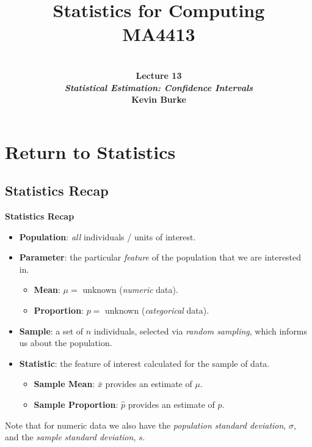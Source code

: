 \documentclass[compress]{beamer}        %
\title{{\huge Statistics for Computing\\[0.1cm]MA4413}}
\author[Kevin Burke]{{\bf\\[0.5cm]{\huge Lecture 13}\\[0.2cm]\emph{Statistical Estimation: Confidence Intervals}\\[1.4cm]Kevin Burke}\\[0.3cm]\tcb{kevin.burke@ul.ie}}
\institute[University of Limerick, Maths \& Stats Dept]{}
\date{}
\makeatletter
\newcommand{\tcb}{\textcolor{beamer@blendedblue}}
\makeatother
\begin{document}
\begin{frame}[t]
\titlepage
\end{frame}



\section{Return to Statistics}
\subsection{Statistics Recap}
\begin{frame}{\bf \tcb{Statistics Recap\\[-0.9cm]}}

\begin{itemize}\itemsep0.5cm
\item {\bf Population}: \emph{all} individuals / units of interest.
\item {\bf Parameter}: the particular \emph{feature} of the population that we are interested in.
\begin{itemize}\itemsep0.2cm
\item {\bf Mean}: $\mu =$ unknown (\emph{numeric} data).
\item {\bf Proportion}: $p =$ unknown (\emph{categorical} data).
\end{itemize}
\item {\bf Sample}: a set of $n$ individuals, selected via \emph{random sampling}, which informs us about the population.
\item {\bf Statistic}: the feature of interest calculated for the sample of data.
\begin{itemize}\itemsep0.2cm
\item {\bf Sample Mean}: $\bar x$ provides an estimate of $\mu$.
\item {\bf Sample Proportion}: $\hat p$ provides an estimate of $p$.\\[0.4cm]
\end{itemize}
\end{itemize}

Note that for numeric data we also have the \emph{population standard deviation}, $\sigma$, and the \emph{sample standard deviation}, $s$.

\end{frame}
\end{document}
